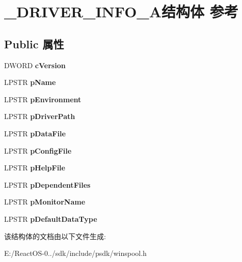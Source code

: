 \hypertarget{struct___d_r_i_v_e_r___i_n_f_o__3_a}{}\section{\+\_\+\+D\+R\+I\+V\+E\+R\+\_\+\+I\+N\+F\+O\+\_\+A结构体 参考}
\label{struct___d_r_i_v_e_r___i_n_f_o__3_a}
\subsection*{Public 属性}
\begin{DoxyCompactItemize}
\item 
\mbox{\label{struct___d_r_i_v_e_r___i_n_f_o__3_a_a5880754fcf5f111a64f923e085de650a}} 
D\+W\+O\+RD {\bfseries c\+Version}
\item 
\mbox{\label{struct___d_r_i_v_e_r___i_n_f_o__3_a_add96f9ee794703869e8c0b1f0b2adbb9}} 
L\+P\+S\+TR {\bfseries p\+Name}
\item 
\mbox{\label{struct___d_r_i_v_e_r___i_n_f_o__3_a_a82a68a4137547daf0e878ce5ee8a27d7}} 
L\+P\+S\+TR {\bfseries p\+Environment}
\item 
\mbox{\label{struct___d_r_i_v_e_r___i_n_f_o__3_a_a2dae2e82561951e681ece55b61039764}} 
L\+P\+S\+TR {\bfseries p\+Driver\+Path}
\item 
\mbox{\label{struct___d_r_i_v_e_r___i_n_f_o__3_a_a68b582ec3aaca3b611c0dc7d715222ba}} 
L\+P\+S\+TR {\bfseries p\+Data\+File}
\item 
\mbox{\label{struct___d_r_i_v_e_r___i_n_f_o__3_a_a3eb505b905ce625d2a87a2071909c22c}} 
L\+P\+S\+TR {\bfseries p\+Config\+File}
\item 
\mbox{\label{struct___d_r_i_v_e_r___i_n_f_o__3_a_ae7746bf9357518ae22df471cf90a9680}} 
L\+P\+S\+TR {\bfseries p\+Help\+File}
\item 
\mbox{\label{struct___d_r_i_v_e_r___i_n_f_o__3_a_aadc411a2fb23326104ddaf39ae4215af}} 
L\+P\+S\+TR {\bfseries p\+Dependent\+Files}
\item 
\mbox{\label{struct___d_r_i_v_e_r___i_n_f_o__3_a_a5bc0e396865700d991c35083b75eaf91}} 
L\+P\+S\+TR {\bfseries p\+Monitor\+Name}
\item 
\mbox{\label{struct___d_r_i_v_e_r___i_n_f_o__3_a_adaf2aa0ff30d9e285829523d31b9b1be}} 
L\+P\+S\+TR {\bfseries p\+Default\+Data\+Type}
\end{DoxyCompactItemize}


该结构体的文档由以下文件生成\+:\begin{DoxyCompactItemize}
\item 
E\+:/\+React\+O\+S-\/0../sdk/include/psdk/winspool.\+h\end{DoxyCompactItemize}
